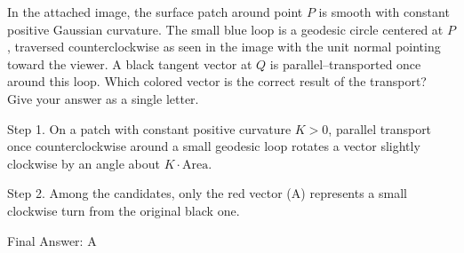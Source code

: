 In the attached image, the surface patch around point $P$ is smooth with constant positive Gaussian curvature. The small blue loop is a geodesic circle centered at $P$, traversed counterclockwise as seen in the image with the unit normal pointing toward the viewer. A black tangent vector at $Q$ is parallel–transported once around this loop. Which colored vector is the correct result of the transport? Give your answer as a single letter.

Step 1. On a patch with constant positive curvature $K>0$, parallel transport once counterclockwise around a small geodesic loop rotates a vector slightly clockwise by an angle about $K \cdot \text{Area}$.

Step 2. Among the candidates, only the red vector  (A) represents a small clockwise turn from the original black one.

Final Answer: A